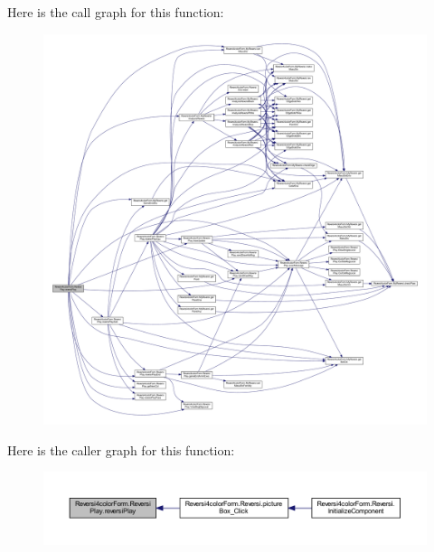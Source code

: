 Here is the call graph for this function\+:\nopagebreak
\begin{figure}[H]
\begin{center}
\leavevmode
\includegraphics[width=350pt]{class_reversi4color_form_1_1_reversi_play_a88c4cd228512f02a940fbe147c9d75c3_cgraph}
\end{center}
\end{figure}
Here is the caller graph for this function\+:\nopagebreak
\begin{figure}[H]
\begin{center}
\leavevmode
\includegraphics[width=350pt]{class_reversi4color_form_1_1_reversi_play_a88c4cd228512f02a940fbe147c9d75c3_icgraph}
\end{center}
\end{figure}
\mbox{\label{class_reversi4color_form_1_1_reversi_play_a0fdeec03a631927d44ed2602808b8619}} 

